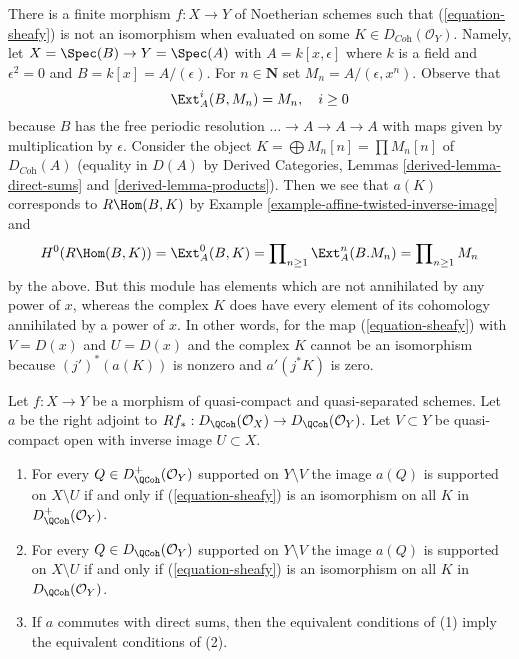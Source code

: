 \begin{example}
\label{example-not-supported-on-inverse-image}
There is a finite morphism $f : X \to Y$ of Noetherian schemes
such that (\ref{equation-sheafy}) is not an isomorphism
when evaluated on some
$K \in D_{\textit{Coh}}(\mathcal{O}_Y)$.
Namely, let $X = \Spec(B) \to Y = \Spec(A)$ with
$A = k[x, \epsilon]$ where $k$ is a field and $\epsilon^2 = 0$ and
$B = k[x] = A/(\epsilon)$. For $n \in \mathbf{N}$ set
$M_n = A/(\epsilon, x^n)$. Observe that
$$
\Ext^i_A(B, M_n) = M_n,\quad i \geq 0
$$
because $B$ has the free periodic resolution
$\ldots \to A \to A \to A$ with maps given by multiplication by $\epsilon$.
Consider the object
$K = \bigoplus M_n[n] = \prod M_n[n]$
of $D_{\textit{Coh}}(A)$ (equality in $D(A)$ by
Derived Categories, Lemmas \ref{derived-lemma-direct-sums} and
\ref{derived-lemma-products}). Then we see that $a(K)$ corresponds
to $R\Hom(B, K)$ by Example \ref{example-affine-twisted-inverse-image} and
$$
H^0(R\Hom(B, K)) = \Ext^0_A(B, K) =
\prod\nolimits_{n \geq 1} \Ext^n_A(B. M_n) = 
\prod\nolimits_{n \geq 1} M_n
$$
by the above. But this module has elements which are not
annihilated by any power of $x$, whereas the complex $K$
does have every element of its cohomology annihilated by
a power of $x$. In other words, for the map (\ref{equation-sheafy})
with $V = D(x)$ and $U = D(x)$ and the complex $K$ cannot
be an isomorphism because $(j')^*(a(K))$ is nonzero and
$a'(j^*K)$ is zero.
\end{example}

\begin{lemma}
\label{lemma-when-sheafy}
Let $f : X \to Y$ be a morphism of quasi-compact and quasi-separated
schemes. Let $a$ be the right adjoint to
$Rf_* : D_\QCoh(\mathcal{O}_X) \to D_\QCoh(\mathcal{O}_Y)$.
Let $V \subset Y$ be quasi-compact open with inverse image $U \subset X$.
\begin{enumerate}
\item For every $Q \in D_\QCoh^+(\mathcal{O}_Y)$
supported on $Y \setminus V$ the image $a(Q)$ is supported on
$X \setminus U$ if and only if (\ref{equation-sheafy})
is an isomorphism on all $K$ in $D_\QCoh^+(\mathcal{O}_Y)$.
\item For every $Q \in D_\QCoh(\mathcal{O}_Y)$
supported on $Y \setminus V$ the image $a(Q)$ is supported on
$X \setminus U$ if and only if (\ref{equation-sheafy})
is an isomorphism on all $K$ in $D_\QCoh(\mathcal{O}_Y)$.
\item If $a$ commutes with direct sums, then the equivalent conditions of
(1) imply the equivalent conditions of (2).
\end{enumerate}
\end{lemma}

